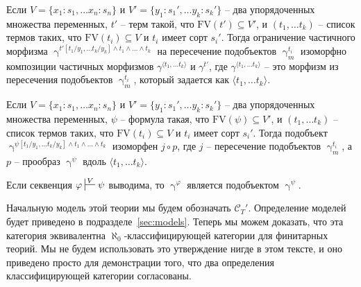 \documentclass[reqno]{amsart}
\theoremstyle{definition}
\theoremstyle{remark}
\newcommand{\cat}[1]{\mathcal{#1}}
\newcommand{\fs}[1]{\mathrm{#1}}
\newcommand{\FV}{\fs{FV}}
\begin{document}
\begin{lem}
Если $V = \{ x_1 : s_1, \ldots x_n : s_n \}$ и $V' = \{ y_1 : s_1', \ldots y_k : s_k' \}$ -- два упорядоченных множества переменных, $t'$ -- терм такой, что $\FV(t') \subseteq V'$,
и $(t_1, \ldots t_k)$ -- список термов таких, что $\FV(t_i) \subseteq V$ и $t_i$ имеет сорт $s_i'$.
Тогда ограничение частичного морфизма $\upgamma^{t'[t_1/y_1, \ldots t_k/y_k] \land t_1 \land \ldots \land t_k}$ на пересечение подобъектов $\upgamma^{t_i}_m$ изоморфно композиции частичных морфизмов $\gamma^{\langle t_1, \ldots t_k \rangle}$ и $\gamma^{t'}$,
где $\gamma^{\langle t_1, \ldots t_k \rangle}$ -- это морфизм из пересечения подобъектов $\upgamma^{t_i}_m$, который задается как $\langle t_1, \ldots t_k \rangle$.
\end{lem}

\begin{lem}
Если $V = \{ x_1 : s_1, \ldots x_n : s_n \}$ и $V' = \{ y_1 : s_1', \ldots y_k : s_k' \}$ -- два упорядоченных множества переменных, $\psi$ -- формула такая, что $\FV(\psi) \subseteq V'$,
и $(t_1, \ldots t_k)$ -- список термов таких, что $\FV(t_i) \subseteq V$ и $t_i$ имеет сорт $s_i'$.
Тогда подобъект $\upgamma^{\psi[t_1/y_1, \ldots t_k/y_k] \land t_1 \land \ldots \land t_k}$ изоморфен $j \circ p$, где $j$ -- пересечение подобъектов $\upgamma^{t_i}_m$, а $p$ -- прообраз $\upgamma^\psi$ вдоль $\langle t_1, \ldots t_k \rangle$.
\end{lem}

\begin{thm}
Если секвенция $\varphi \sststile{}{V} \psi$ выводима, то $\upgamma^\varphi$ является подобъектом $\upgamma^\psi$.
\end{thm}

Начальную модель этой теории мы будем обозначать $\cat{C}_T'$.
Определение моделей будет приведено в подразделе~\ref{sec:models}.
Теперь мы можем доказать, что эта категория эквивалентна $\aleph_0$-классифицирующей категории для финитарных теорий.
Мы не будем использовать это утверждение нигде в этом тексте, и оно приведено просто для демонстрации того, что два определения классифицирующей категории согласованы.
\end{document}
